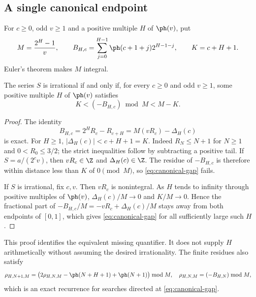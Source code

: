 \subsection{A single canonical endpoint}\label{sec:frontier}
For $c\ge0$, odd $v\ge1$ and a positive multiple $H$ of $\ph(v)$, put
\[
 M=\frac{2^H-1}{v},\qquad
 B_{H,c}=\sum_{j=0}^{H-1}\ph(c+1+j)2^{H-1-j},\qquad K=c+H+1.
\]
Euler's theorem makes $M$ integral.

\begin{equivform}\label{res:canonicalmersenne}
The series $S$ is irrational if and only if, for every $c\ge0$ and odd
$v\ge1$, some positive multiple $H$ of $\ph(v)$ satisfies
\begin{equation}\label{eq:canonical-gap}
 K<(-B_{H,c})\bmod M<M-K.
\end{equation}
\end{equivform}
\begin{proof}
The identity
\[
 B_{H,c}=2^HR_c-R_{c+H}=M(vR_c)-\Delta_H(c)
\]
is exact. For $H\ge1$, $|\Delta_H(c)|<c+H+1=K$. Indeed $R_N\le N+1$
for $N\ge1$ and $0<R_0\le3/2$; the strict inequalities follow by subtracting
a positive tail. If $S=a/(2^cv)$, then $vR_c\in\Z$ and
$\Delta_H(c)\in\Z$. The residue of $-B_{H,c}$ is therefore within distance
less than $K$ of $0\pmod M$, so \eqref{eq:canonical-gap} fails.

If $S$ is irrational, fix $c,v$. Then $vR_c$ is nonintegral. As $H$ tends
to infinity through positive multiples of $\ph(v)$,
$\Delta_H(c)/M\to0$ and $K/M\to0$. Hence the fractional part of
$-B_{H,c}/M=-vR_c+\Delta_H(c)/M$ stays away from both endpoints of $[0,1]$,
which gives \eqref{eq:canonical-gap} for all sufficiently large such $H$.
\end{proof}
This proof identifies the equivalent missing quantifier. It does not supply
$H$ arithmetically without assuming the desired irrationality.
The finite residues also satisfy
\[
 \rho_{H,N+1,M}=
 \bigl(2\rho_{H,N,M}-\ph(N+H+1)+\ph(N+1)\bigr)\bmod M,
 \quad \rho_{H,N,M}=(-B_{H,N})\bmod M,
\]
which is an exact recurrence for searches directed at \eqref{eq:canonical-gap}.
